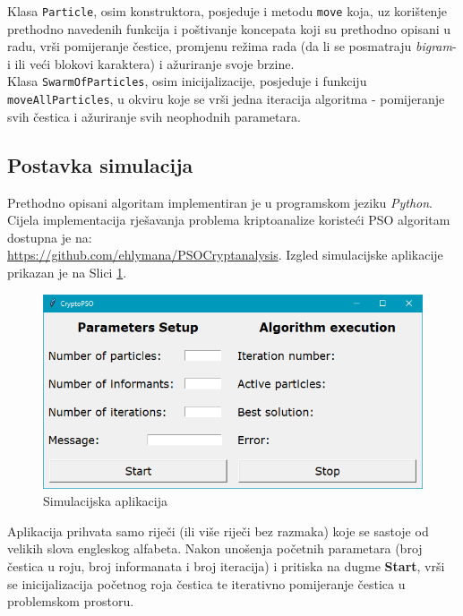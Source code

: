 \documentclass[12pt, a4paper]{article}
\begin{document}
Klasa \texttt{Particle}, osim konstruktora, posjeduje i metodu \texttt{move} koja, uz korištenje prethodno navedenih funkcija i poštivanje koncepata koji su prethodno opisani u radu, vrši pomijeranje čestice, promjenu režima rada (da li se posmatraju \textit{bigram}-i ili veći blokovi karaktera) i ažuriranje svoje brzine. \\

Klasa \texttt{SwarmOfParticles}, osim inicijalizacije, posjeduje i funkciju \texttt{moveAllParticles}, u okviru koje se vrši jedna iteracija algoritma - pomijeranje svih čestica i ažuriranje svih neophodnih parametara.

\subsection{Postavka simulacija}

Prethodno opisani algoritam implementiran je u programskom jeziku \textit{Python}. Cijela implementacija rješavanja problema kriptoanalize koristeći PSO algoritam dostupna je na: \\ \href{https://github.com/ehlymana/PSOCryptanalysis}{https://github.com/ehlymana/PSOCryptanalysis}. Izgled simulacijske aplikacije prikazan je na Slici \ref{gui}.

\begin{figure}[H]

\center
\includegraphics[scale=0.7]{res/gui.png}
\caption{Simulacijska aplikacija}
\label{gui}

\end{figure}

Aplikacija prihvata samo riječi (ili više riječi bez razmaka) koje se sastoje od velikih slova engleskog alfabeta. Nakon unošenja početnih parametara (broj čestica u roju, broj informanata i broj iteracija) i pritiska na dugme \textbf{Start}, vrši se inicijalizacija početnog roja čestica te iterativno pomijeranje čestica u problemskom prostoru. \\
\end{document}
